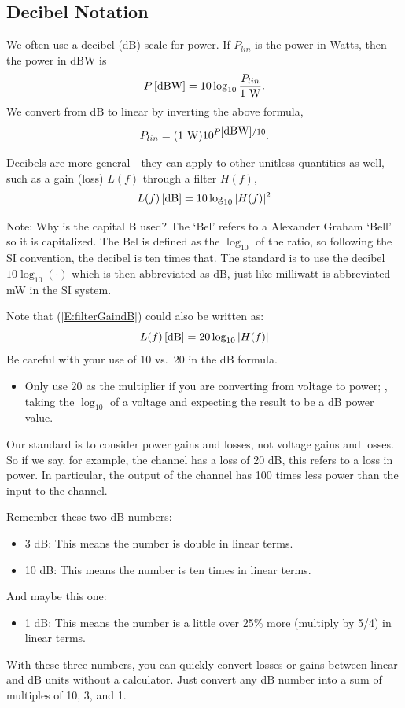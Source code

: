 \subsection{Decibel Notation}

We often use a decibel (dB) scale for power.  If $P_{lin}$ is the
power in Watts, then the power in dBW is
\[
  {P}\left[ \mbox{dBW} \right] = 10 \log_{10} \frac{P_{lin}}{1 \mbox{ W}}.
\]
We convert from dB to linear by inverting the above formula,
\[
  P_{lin} = (1 \mbox{ W}) 10^{{P}\left[ \mbox{dBW} \right]/10} .
\]

Decibels are more general - they can apply to other unitless
quantities as well, such as a gain (loss) $L(f)$ through a filter
$H(f)$,
\begin{equation} \label{E:filterGaindB}
  {L(f)}\left[\mbox{dB}\right] = 10 \log_{10} |H(f)|^2
\end{equation}

Note: Why is the capital B used?  The `Bel' refers to a Alexander Graham
`Bell' so it is capitalized.  The Bel is defined as the $\log_{10}$ of the ratio, so following the SI convention, the decibel is ten times that. The standard is to use the
decibel $10 \log_{10} (\cdot)$ which is then abbreviated as dB, just like milliwatt is abbreviated mW in the SI system.

Note that (\ref{E:filterGaindB}) could also be written as:
\begin{equation} \label{E:filterGaindB2}
  {L(f)}\left[\mbox{dB}\right] = 20 \log_{10} |H(f)|
\end{equation}
Be careful with your use of 10 vs.~20 in the dB formula.  
\begin{itemize}
 \item Only use 20 as the multiplier if you are converting from voltage to power; \ie, taking the $\log_{10}$ of a voltage and expecting the result to be a dB power value.
\end{itemize}

Our standard is to consider power gains and losses, not voltage gains and losses.  So if we say, for example, the channel has a loss of 20 dB, this refers to a loss in power.  In particular, the output of the channel has 100 times less power than the input to the channel.

Remember these two dB numbers:
\begin{itemize}
  \item 3 dB:  This means the number is double in linear terms.
  \item 10 dB:  This means the number is ten times in linear terms.
\end{itemize}
And maybe this one:
\begin{itemize}
  \item 1 dB:  This means the number is a little over 25\% more (multiply by 5/4) in linear terms.
\end{itemize}
With these three numbers, you can quickly convert losses or gains between
linear and dB units without a calculator.  Just convert any dB number into a sum of multiples of 10, 3, and 1.

